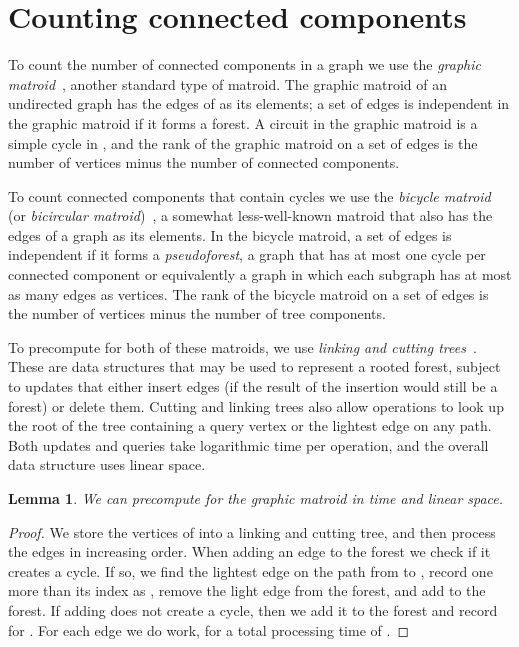 \documentclass[11pt]{article}
\newtheorem{lemma}{Lemma}
\begin{document}
\section{Counting connected components}
To count the number of connected components in a graph we use the \emph{graphic matroid}~\cite{Welsh10}, another standard type of matroid. The graphic matroid of an undirected graph  has the edges of  as its elements; a set of edges is independent in the graphic matroid if it forms a forest. A circuit in the graphic matroid is a simple cycle in , and the rank of the graphic matroid on a set of edges is the number of vertices minus the number of connected components.

To count connected components that contain cycles we use the \emph{bicycle matroid} (or \emph{bicircular matroid})~\cite{Matthews77}, a somewhat less-well-known matroid that also has the edges of a graph as its elements. In the bicycle matroid, a set of edges is independent if it forms a \emph{pseudoforest}, a graph that has at most one cycle per connected component or equivalently a graph in which each subgraph has at most as many edges as vertices. The rank of the bicycle matroid on a set of edges is the number of vertices minus the number of tree components.

To precompute  for both of these matroids, we use \emph{linking and cutting trees}~\cite{LinkCutArt, LinkCutBook}. These are data structures that may be used to represent a rooted forest, subject to updates that either insert edges (if the result of the insertion would still be a forest) or delete them. Cutting and linking trees also allow operations to look up the root of the tree containing a query vertex or the lightest edge on any path. Both updates and queries take logarithmic time per operation, and the overall data structure uses linear space.

\begin{lemma}\label{lem:connected-component}
We can precompute  for the graphic matroid in  time and linear space.
\end{lemma}
\begin{proof}
We store the vertices of  into a linking and cutting tree, and then process the edges in increasing order. When adding an edge  to the forest we check if it creates a cycle. If so, we find the lightest edge on the path from  to , record one more than its index as , remove the light edge from the forest, and add  to the forest. If adding  does not create a cycle, then we add it to the forest and record  for . For each edge we do  work, for a total processing time of .
\end{proof}
\end{document}
